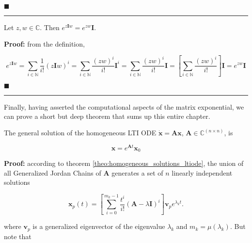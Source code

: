 \hfill$\blacksquare$
\vspace{5mm}
\hrule
\vspace{5mm} %

\begin{theorem} \label{theo:matrix_exponential_identity_scaling} %
	Let $z,w\in\mathbb{C}$. Then $e^{z\mathbf{I}w} = e^{zw}\mathbf{I}$.
\end{theorem}
\textbf{Proof:} from the definition,

\begin{equation} e^{z\mathbf{I}w} = \sum\limits_{i\in\mathbb{N}} \dfrac{1}{i!} \left(z\mathbf{I}w\right)^i = \sum\limits_{i\in\mathbb{N}} \dfrac{\left(zw\right)^i}{i!} \mathbf{I}^i = \sum\limits_{i\in\mathbb{N}} \dfrac{\left(zw\right)^i}{i!} \mathbf{I} = \left[\sum\limits_{i\in\mathbb{N}} \dfrac{\left(zw\right)^i}{i!}\right] \mathbf{I} = e^{zw}\mathbf{I} \end{equation}

\hfill$\blacksquare$
\vspace{5mm}
\hrule
\vspace{5mm} %

	Finally, having asserted the computational aspects of the matrix exponential, we can prove a short but deep theorem that sums up this entire chapter.
 	
\begin{theorem} \label{theo:homogeneous_solutions_ltiode_matrix} %
	The general solution of the homogeneous LTI ODE $\dot{\mathbf{x}} = \mathbf{Ax}$, $\mathbf{A}\in\mathbb{C}^{(n\times n)}$, is

\begin{equation} \mathbf{x} = e^{\mathbf{A}t}\mathbf{x}_0 \end{equation}
\end{theorem}
\textbf{Proof:} according to theorem \ref{theo:homogeneous_solutions_ltiode}, the union of all Generalized Jordan Chains of $\mathbf{A}$ generates a set of $n$ linearly independent solutions

\begin{equation} \mathbf{x}_p(t) =  \left[\displaystyle\sum\limits_{i=0}^{m_k-1} \dfrac{t^i}{i!}\left(\mathbf{A} - \lambda\mathbf{I}\right)^{i}\right]\mathbf{v}_p e^{\lambda_k t}. \end{equation}

	where $\mathbf{v}_p$ is a generalized eigenvector of the eigenvalue $\lambda_k$ and $m_k = \mu\left(\lambda_k\right)$. 	But note that


